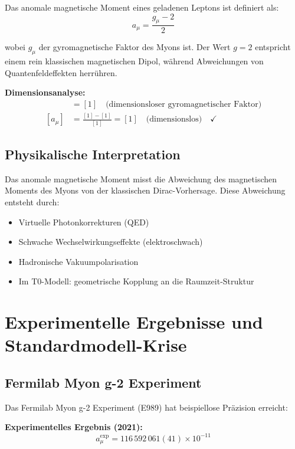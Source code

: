 \documentclass[12pt,a4paper]{report}
\begin{document}
Das anomale magnetische Moment eines geladenen Leptons ist definiert als:
\begin{equation}
	a_\mu = \frac{g_\mu - 2}{2}
	\label{eq:anomalous_moment_definition}
\end{equation}

wobei $g_\mu$ der gyromagnetische Faktor des Myons ist. Der Wert $g = 2$ entspricht einem rein klassischen magnetischen Dipol, während Abweichungen von Quantenfeldeffekten herrühren.

\textbf{Dimensionsanalyse:}
\begin{align}
	[g_\mu] &= [1] \quad \text{(dimensionsloser gyromagnetischer Faktor)} \\
	[a_\mu] &= \frac{[1] - [1]}{[1]} = [1] \quad \text{(dimensionslos)} \quad \checkmark
\end{align}

\subsection{Physikalische Interpretation}
\label{subsec:physical_interpretation}

Das anomale magnetische Moment misst die Abweichung des magnetischen Moments des Myons von der klassischen Dirac-Vorhersage. Diese Abweichung entsteht durch:
\begin{itemize}
	\item Virtuelle Photonkorrekturen (QED)
	\item Schwache Wechselwirkungseffekte (elektroschwach)
	\item Hadronische Vakuumpolarisation
	\item Im T0-Modell: geometrische Kopplung an die Raumzeit-Struktur
\end{itemize}

\section{Experimentelle Ergebnisse und Standardmodell-Krise}
\label{sec:experimental_results}

\subsection{Fermilab Myon g-2 Experiment}
\label{subsec:fermilab_results}

Das Fermilab Myon g-2 Experiment (E989) hat beispiellose Präzision erreicht:

\textbf{Experimentelles Ergebnis (2021):}
\begin{equation}
	a_\mu^{\text{exp}} = 116\,592\,061(41) \times 10^{-11}
	\label{eq:experimental_value}
\end{equation}
\end{document}
